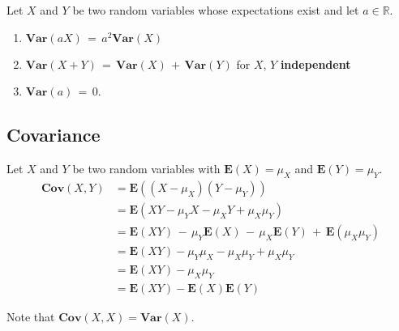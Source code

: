 \documentclass[11pt,letterpaper]{article}
\newcommand{\E}[1]{\mathbf{E}\left(#1\right)}
\newcommand{\Var}[1]{\mathbf{Var}\left(#1\right)}
\newcommand{\Cov}[1]{\mathbf{Cov}\left(#1\right)}
\newcommand{\blue}[1]{{\color{blue}#1}}
\newcommand{\red}[1]{{\color{red}#1}}
\begin{document}
Let $X$ and $Y$ be two random variables whose expectations exist and let $a \in \mathbb{R}$.

\begin{enumerate}
\item $\Var{aX} \,=\, a^{2}\Var{X}$
\item $\Var{X+Y} \,=\, \Var{X} \,+\, \Var{Y}$ for $X$, $Y$ \textbf{\red{independent}}
\item $\Var{a} \,=\, 0$.
\end{enumerate}


\subsection*{\blue{Covariance}}

Let $X$ and $Y$ be two random variables with $\E{X} = \mu_{X}$ and $\E{Y} = \mu_{Y}$.
\begin{align*}
\Cov{X,Y} &= \E{(X - \mu_{X})(Y - \mu_{Y})}\\
&= \E{XY - \mu_{Y}X - \mu_{X}Y + \mu_{X}\mu_{Y}}\\
&= \E{XY} \,-\, \mu_{Y}\E{X} \,-\, \mu_{X}\E{Y} \,+\, \E{\mu_{X}\mu_{Y}}\\
&= \E{XY} - \mu_{Y}\mu_{X} - \mu_{X}\mu_{Y} + \mu_{X}\mu_{Y}\\
&= \E{XY} - \mu_{X}\mu_{Y}\\
&= \E{XY} - \E{X}\E{Y}
\end{align*}

Note that $\Cov{X,X} = \Var{X}$.
\end{document}
